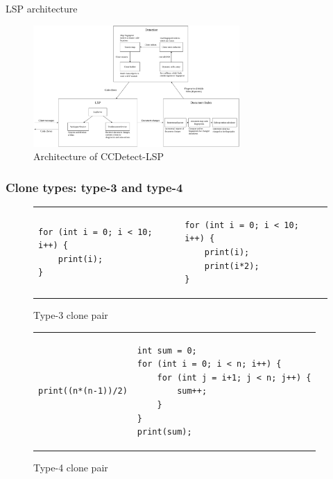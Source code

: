 \documentclass[aspectratio=1610, xcolor=table]{beamer}
\begin{document}
\begin{frame}{LSP architecture}
    \begin{figure}
        \begin{center}
            \includegraphics[width=0.7\textwidth]{figures/architecture.drawio.pdf}
        \end{center}
        \caption{Architecture of CCDetect-LSP}
    \end{figure}
\end{frame}

\begin{frame}[fragile]
	\frametitle{Clone types: type-3 and type-4}
    \vspace{0.5cm}
	\begin{figure}[t]
		\begin{center}
			\begin{tabular}{p{6cm} | p{6cm}}
				\begin{lstlisting}
for (int i = 0; i < 10; i++) {
    print(i);
}\end{lstlisting} &
				\begin{lstlisting}
for (int i = 0; i < 10; i++) {
    print(i);
    print(i*2);
}\end{lstlisting}
			\end{tabular}
		\end{center}
		\caption{Type-3 clone pair}
		\label{fig:type3clone}
	\end{figure}
    \vspace{-0.5cm}

	\begin{figure}[t]
		\begin{center}
			\begin{tabular}{r | p{6.5cm}}
				\hspace{3.2cm}\begin{lstlisting}
print((n*(n-1))/2)
\end{lstlisting} &
				\begin{lstlisting}
int sum = 0;
for (int i = 0; i < n; i++) {
    for (int j = i+1; j < n; j++) {
        sum++;
    }
}
print(sum);
            \end{lstlisting}
			\end{tabular}
		\end{center}
		\caption{Type-4 clone pair}
		\label{fig:type4clone}
	\end{figure}
\end{frame}
\end{document}
